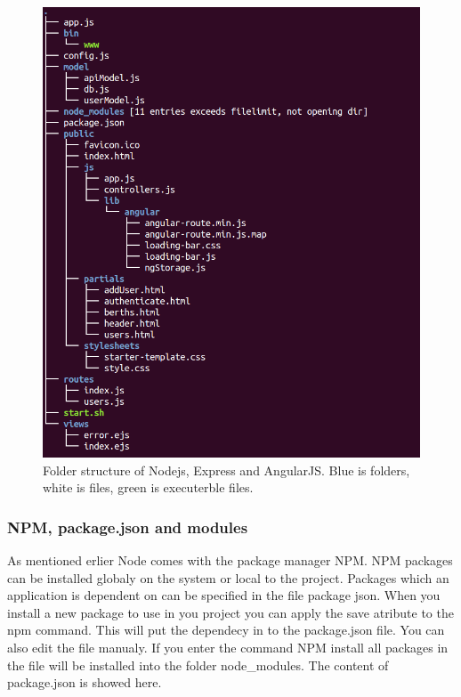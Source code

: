 \documentclass[a4paper,12pt,english]{article}
\begin{document}
\begin{center}
\begin{figure}[h]
\includegraphics[scale=0.45]{img/express.png}
\caption{Folder structure of Nodejs, Express and AngularJS. Blue is folders,
white is files, green is executerble files.}
\label{express}
\end{figure}
\end{center}

\subsubsection{NPM, package.json and modules}
As mentioned erlier Node comes with the package manager NPM. NPM packages can be
installed globaly on the system or local to the project. Packages which an
application is dependent on can be specified in the file package json. When you
install a new package to use in you project you can apply the save atribute to
the npm command. This will put the dependecy in to the package.json file. You
can also edit the file manualy. If you enter the command NPM install all
packages in the file will be installed into the folder node\_modules. The
content of package.json is showed here.
\end{document}
